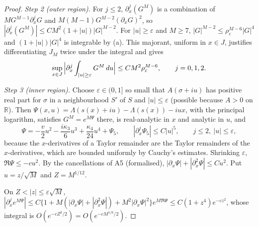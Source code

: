 \documentclass[11pt,a4paper]{article}
\theoremstyle{remark}
\newcommand{\R}{\mathbb R}
\numberwithin{equation}{section}
\begin{document}
\begin{proof}
\emph{Step 2 (outer region).} For $j\le2$, $\partial_x^j(G^M)$ is a combination of
$MG^{M-1}\partial_x^jG$ and $M(M-1)G^{M-2}(\partial_xG)^2$, so
$|\partial_x^j(G^M)|\le CM^2(1+|u|)|G|^{M-2}$. For $|u|\ge\varepsilon$ and $M\ge7$,
$|G|^{M-2}\le\rho_\varepsilon^{M-6}|G|^4$ and $(1+|u|)|G|^4$ is integrable by (a). This
majorant, uniform in $x\in J$, justifies differentiating $J_M$ twice under the integral and
gives
\begin{equation}\label{eq:outer}
 \sup_{x\in J}\,\Bigl|\partial_x^j\int_{|u|\ge\varepsilon}G^M\,du\Bigr|\le CM^2\rho_\varepsilon^{M-6},
 \qquad j=0,1,2 .
\end{equation}

\emph{Step 3 (inner region).} Choose $\varepsilon\in(0,1]$ so small that $A(\sigma+iu)$ has
positive real part for $\sigma$ in a neighbourhood $S'$ of $S$ and $|u|\le\varepsilon$
(possible because $A>0$ on $\R$). Then
$\Psi(x,u)=\Lambda(s(x)+iu)-\Lambda(s(x))-iux$, with the principal logarithm, satisfies
$G^M=e^{M\Psi}$ there, is real-analytic in $x$ and analytic in $u$, and
\begin{equation}\label{eq:Psi}
 \Psi=-\frac{v}{2}u^2-\frac{i\kappa_3}{6}u^3+\frac{\kappa_4}{24}u^4+\Psi_5,\qquad
 |\partial_x^j\Psi_5|\le C|u|^5,\qquad j\le2,\ |u|\le\varepsilon,
\end{equation}
because the $x$-derivatives of a Taylor remainder are the Taylor remainders of the
$x$-derivatives, which are bounded uniformly by Cauchy's estimates. Shrinking $\varepsilon$,
$\Re\Psi\le-cu^2$. By the cancellations of A5 (formalised), $|\partial_x\Psi|+
|\partial_x^2\Psi|\le Cu^2$. Put $u=z/\sqrt M$ and $Z=M^{1/12}$.

On $Z<|z|\le\varepsilon\sqrt M$,
$|\partial_x^je^{M\Psi}|\le C\{1+M(|\partial_x\Psi|+|\partial_x^2\Psi|)+M^2|\partial_x\Psi|^2\}
e^{M\Re\Psi}\le C(1+z^4)e^{-cz^2}$, whose integral is $O(e^{-cZ^2/2})=O(e^{-cM^{1/6}/2})$.


\end{proof}
\end{document}
